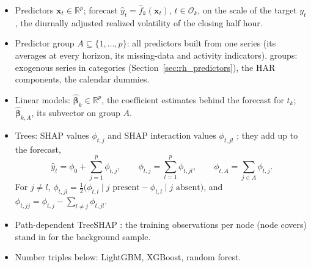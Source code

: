 \begin{itemize}
\begin{itemize}
    forecasts its out-of-sample block $\mathcal O_k$, the trading days from $t_k$ to the next re-estimation
    ($\le \rhfiRefitEvery$).
    The blocks make up this section's forecast days $\mathcal O = \bigcup_k \mathcal O_k$:
    $|\mathcal O| = \rhfiNOos$ trading days, \rhfiFirst{} to \rhfiLast.
  \item Predictors $\bm x_t \in \mathbb{R}^p$; forecast $\hat y_t = \hat f_k(\bm x_t)$, $t \in \mathcal O_k$, on the
    scale of the target $y_t$, the diurnally adjusted realized volatility of the closing half hour.
  \item Predictor group $A \subseteq \{1, \dots, p\}$: all predictors built from one series (its averages at every
    horizon, its missing-data and activity indicators). \rhfiNUnits{} groups: \rhfiNExog{} exogenous series in
    \rhfiNBuckets{} categories (Section~\ref{sec:rh_predictors}), the HAR components, the calendar dummies.
  \item Linear models: $\hat{\bm\beta}_k \in \mathbb{R}^p$, the coefficient estimates behind the forecast for $t_k$;
    $\hat{\bm\beta}_{k,A}$, its subvector on group $A$.
  \item Trees: SHAP values $\phi_{t,j}$ \citep{lundberg2017unified} and SHAP interaction values $\phi_{t,jl}$
    \citep{lundberg2020local}; they add up to the forecast,
    \[
      \hat y_t = \phi_0 + \sum_{j=1}^{p} \phi_{t,j}, \qquad
      \phi_{t,j} = \sum_{l=1}^{p} \phi_{t,jl}, \qquad
      \phi_{t,A} = \sum_{j \in A} \phi_{t,j}.
    \]
    For $j \ne l$, $\phi_{t,jl} = \tfrac12\bigl(\phi_{t,l} \mid j \text{ present} - \phi_{t,l} \mid j \text{ absent}\bigr)$,
    and $\phi_{t,jj} = \phi_{t,j} - \sum_{l \ne j} \phi_{t,jl}$.
  \item Path-dependent TreeSHAP \citep{lundberg2020local}: the training observations per node (node covers) stand in
    for the background sample.
  \item Number triples below: LightGBM, XGBoost, random forest.

\end{itemize}
\end{itemize}
